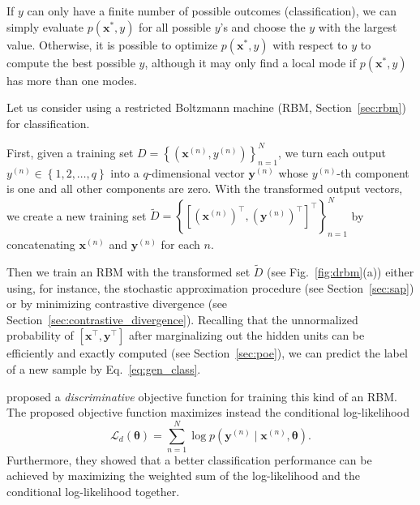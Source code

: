 \documentclass{now}
\newcommand{\vect}[1]{\mathbf{#1}}
\newcommand{\vects}[1]{\boldsymbol{#1}}
\newcommand{\vx}[0]{\vect{x}}
\newcommand{\vy}[0]{\vect{y}}
\newcommand{\TT}[0]{{\vects{\theta}}}
\newcommand{\LL}[0]{\mathcal{L}}
\begin{document}
If $y$ can only have a finite number of possible outcomes (classification), we
can simply evaluate $p(\vx^*, y)$ for all possible $y$'s and choose the $y$ with
the largest value.  Otherwise, it is possible to optimize $p(\vx^*, y)$ with
respect to $y$ to compute the best possible $y$, although it may only find a
local mode if $p(\vx^*, y)$ has more than one modes.

Let us consider using a restricted Boltzmann machine (RBM,
Section~\ref{sec:rbm}) for classification. 

First, given a training set $D=\left\{ \left( \vx^{(n)}, y^{(n)} \right)
\right\}_{n=1}^N$, we turn each output $y^{(n)} \in \left\{ 1, 2, \dots, q
\right\}$ into a $q$-dimensional vector $\vy^{(n)}$ whose $y^{(n)}$-th component
is one and all other components are zero. With the transformed output vectors,
we create a new training set $\tilde{D} = \left\{ \left[(\vx^{(n)})^\top,
(\vy^{(n)})^\top \right]^\top \right\}_{n=1}^N$ by concatenating $\vx^{(n)}$ and
$\vy^{(n)}$ for each $n$.

Then we train an RBM with the transformed set $\tilde{D}$ (see
Fig.~\ref{fig:drbm}(a)) either using, for instance, the stochastic approximation
procedure (see Section~\ref{sec:sap}) or by minimizing contrastive divergence
(see Section~\ref{sec:contrastive_divergence}). Recalling that the unnormalized
probability of $\left[ \vx^\top, \vy^\top \right]$ after marginalizing out the
hidden units can be efficiently and exactly computed (see
Section~\ref{sec:poe}), we can predict the label of a new sample by
Eq.~\eqref{eq:gen_class}.

\citet{Larochelle2008} proposed a \textit{discriminative} objective function for
training this kind of an RBM. The proposed objective function maximizes instead
the conditional log-likelihood 
\[
\LL_d(\TT) = \sum_{n=1}^N \log p(\vy^{(n)} \mid \vx^{(n)},
\TT).
\]
Furthermore, they showed that a better classification performance can be
achieved by maximizing the weighted sum of the log-likelihood and the
conditional log-likelihood together.
\end{document}
